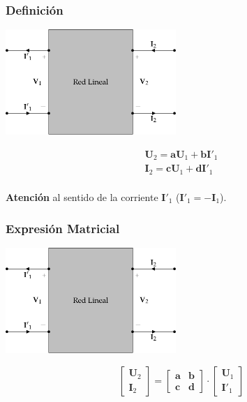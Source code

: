 \subsubsection{Definición}
\label{sec:org52b179c}

\includegraphics[height=4cm]{../figs/cuadripolo_transmision_inversa.pdf}


\[
\begin{array}{l}
  \mathbf{U}_2 = \mathbf{a} \mathbf{U}_1 + \mathbf{b}\mathbf{I'}_1\\
  \mathbf{I}_2 = \mathbf{c} \mathbf{U}_1 + \mathbf{d} \mathbf{I'}_1\\
\end{array}
\]


\textbf{Atención} al sentido de la corriente \(\mathbf{I'}_1\) (\(\mathbf{I'}_1 = - \mathbf{I}_1\)).


\subsubsection{Expresión Matricial}
\label{sec:orgca7fb03}

\includegraphics[height=4cm]{../figs/cuadripolo_transmision_inversa.pdf}


\[
  \left[
    \begin{array}{c}
      \mathbf{U}_2\\
      \mathbf{I}_2
    \end{array}
  \right] =
  \left[
    \begin{array}{cc}
      \mathbf{a} & \mathbf{b}\\
      \mathbf{c} & \mathbf{d}
    \end{array}
  \right] \cdot
  \left[
    \begin{array}{c}
      \mathbf{U}_1\\
      \mathbf{I'}_1
    \end{array}
  \right]
\]

